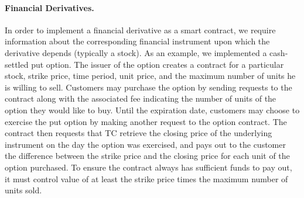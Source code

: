 \paragraph{Financial Derivatives.}  In order to implement a financial derivative as a smart contract, we require information about the corresponding financial instrument upon which the derivative depends (typically a stock).  As an example, we implemented a cash-settled put option.  The issuer of the option creates a contract for a particular stock, strike price, time period, unit price, and the maximum number of units he is willing to sell.  Customers may purchase the option by sending requests to the contract along with the associated fee indicating the number of units of the option they would like to buy.  Until the expiration date, customers may choose to exercise the put option by making another request to the option contract.  The contract then requests that TC retrieve the closing price of the underlying instrument on the day the option was exercised, and pays out to the customer the difference between the strike price and the closing price for each unit of the option purchased.  To ensure the contract always has sufficient funds to pay out, it must control value of at least the strike price times the maximum number of units sold.
\fi

